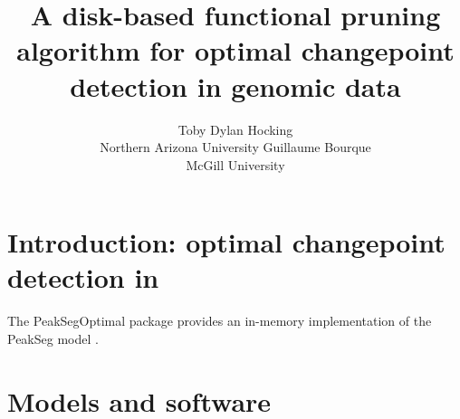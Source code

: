 \documentclass[article]{jss}
\author{Toby Dylan Hocking\\Northern Arizona University
   \And Guillaume Bourque\\McGill University}
\title{A disk-based functional pruning algorithm for optimal changepoint
  detection in genomic data}
\begin{document}


\section[Introduction: optimal changepoint detection in R]{Introduction: optimal changepoint detection in } \label{sec:intro}

The PeakSegOptimal package provides an in-memory implementation of the
PeakSeg model \citep{Hocking-constrained-changepoint-detection}.



\section{Models and software} \label{sec:models}


\end{document}
